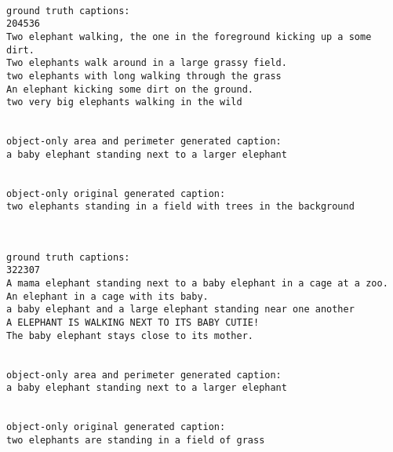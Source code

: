 \documentclass[11pt]{article}
\begin{document}
    \begin{center}
    \end{center}
    { \hspace*{\fill} \\}
    
    \begin{Verbatim}[commandchars=\\\{\}]
ground truth captions:
204536
Two elephant walking, the one in the foreground kicking up a some dirt. 
Two elephants walk around in a large grassy field. 
two elephants with long walking through the grass
An elephant kicking some dirt on the ground.
two very big elephants walking in the wild 


object-only area and perimeter generated caption:
a baby elephant standing next to a larger elephant


object-only original generated caption:
two elephants standing in a field with trees in the background

    \end{Verbatim}

    \begin{center}
    \end{center}
    { \hspace*{\fill} \\}
    
    \begin{Verbatim}[commandchars=\\\{\}]
ground truth captions:
322307
A mama elephant standing next to a baby elephant in a cage at a zoo.
An elephant in a cage with its baby.
a baby elephant and a large elephant standing near one another
A ELEPHANT IS WALKING NEXT TO ITS BABY CUTIE!
The baby elephant stays close to its mother.


object-only area and perimeter generated caption:
a baby elephant standing next to a larger elephant


object-only original generated caption:
two elephants are standing in a field of grass

    \end{Verbatim}

    \begin{center}
    \end{center}
    { \hspace*{\fill} \\}
    
\end{document}
